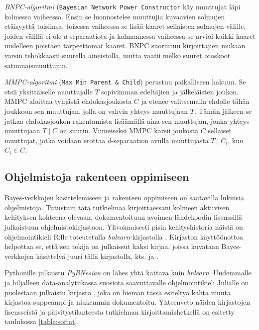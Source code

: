 \emph{BNPC-algoritmi} (\texttt{Bayesian Network Power Constructor}  \citep{natori_constraint-based_2015} käy muuttujat läpi kolmessa vaiheessa. Ensin se luonnostelee muuttujia kuvaavien solmujen etäisyyttä toisiinsa, toisessa vaiheessa se lisää kaaret sellaisten solmujen välille, joiden välillä ei ole $d$-separaatiota ja kolmannessa vaiheessa se arvioi kaikki kaaret uudelleen poistaen tarpeettomat kaaret. BNPC suoriutuu kirjoittajien mukaan varsin tehokkaasti suurella aineistolla, mutta vaatii melko suuret otoskoot satunnaismuuttujiin. 

\emph{MMPC-algoritmi} (\texttt{Max Min Parent \& Child}) \citep{tsamardinos_time_2003} perustuu paikalliseen hakuun. Se etsii yksittäiselle muuttujalle $T$ sopivimman edeltäjien ja jälkeläisten joukon. MMPC aloittaa tyhjästä ehdokasjoukosta $C$ ja etenee valitsemalla ehdolle tähän joukkoon sen muuttujan, jolla on vahvin yhteys muuttujaan $T$. Tämän jälkeen se jatkaa ehdokasjoukon rakentamista lisäämällä aina sen muuttujan, jonka yhteys muuttujaan $T \mid C$ on suurin. Viimeiseksi MMPC karsii joukosta $C$ sellaiset muuttujat, jotka voidaan erottaa $d$-separaation avulla muuttujasta $T \mid C_i$, kun $C_i \in C$.   

\subsection{Ohjelmistoja rakenteen oppimiseen} 

Bayes-verkkojen käsittelemiseen ja rakenteen oppimiseen on saatavilla lukuisia ohjelmistoja. Tutustuin tätä tutkielmaa kirjoittaessani kolmeen aktiivisen kehityksen kohteena olevaan, dokumentoituun avoimen lähdekoodin lisenssillä julkaistuun ohjelmistokirjastoon. Ylivoimaisesti pisin kehityshistoria näistä on ohjelmointikieli R:lle toteutetulla \emph{bnlearn}-kirjastolla \citep{scutari_learning_2010}. Kirjaston käyttöönottoa helpottaa se, että sen tekijä on julkaissut kaksi kirjaa, joissa kuvataan Bayes-verkkojen käsittelyä juuri tällä kirjastolla, kts. \citet{nagarajan_bayesian_2013} ja \citet{R_bayesian_2014}.  

Pythonille julkaistu \emph{PyBNesian} \citep{atienza_pybnesian_2022} on lähes yhtä kattava kuin \emph{bnlearn}. Uudemmalle ja hiljalleen data-analytiikassa suosiota saavuttavalle ohjelmointikieli Julialle on puolestaan julkaistu kirjasto \citet{bayesnetsjl_2021}, joka on hieman tässä esiteltyä kahta muuta kirjastoa suppeampi ja niukemmin dokumentoitu. Yhteenveto näiden kirjastojen lisensseistä ja päivitystilanteesta tutkielman kirjoittamishetkellä on esitetty taulukossa \ref{table:softat}.   

